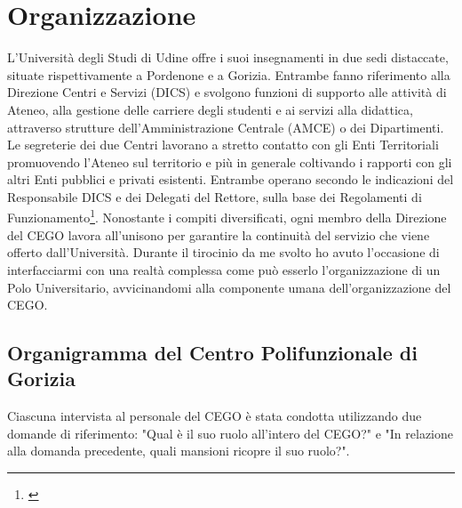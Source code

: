 \setcounter{chapter}{1}

\chapter{Organizzazione}
    \par
        L'Università degli Studi di Udine offre i suoi insegnamenti in due sedi distaccate, situate rispettivamente a Pordenone e a Gorizia. \newline
        Entrambe fanno riferimento alla Direzione Centri e Servizi (DICS) e svolgono funzioni di supporto alle attività di Ateneo, alla gestione delle carriere degli studenti e ai servizi alla didattica, attraverso strutture dell'Amministrazione Centrale (AMCE) o dei Dipartimenti. \newline
        Le segreterie dei due Centri lavorano a stretto contatto con gli Enti Territoriali promuovendo l'Ateneo sul territorio e più in generale coltivando i rapporti con gli altri Enti pubblici e privati esistenti. \newline
        Entrambe operano secondo le indicazioni del Responsabile DICS e dei Delegati del Rettore, sulla base dei Regolamenti di Funzionamento\footnote{\cite{IstruzioniCEGO-CEPO}}. \newline
        Nonostante i compiti diversificati, ogni membro della Direzione del CEGO lavora all'unisono per garantire la continuità del servizio che viene offerto dall'Università. 
        Durante il tirocinio da me svolto ho avuto l'occasione di interfacciarmi con una realtà complessa come può esserlo l'organizzazione di un Polo Universitario, avvicinandomi alla componente umana dell'organizzazione del CEGO. 
    \section{Organigramma del Centro Polifunzionale di Gorizia}
        \par
            Ciascuna intervista al personale del CEGO è stata condotta utilizzando due domande di riferimento: "Qual è il suo ruolo all'intero del CEGO?" e "In relazione alla domanda precedente, quali mansioni ricopre il suo ruolo?". 

